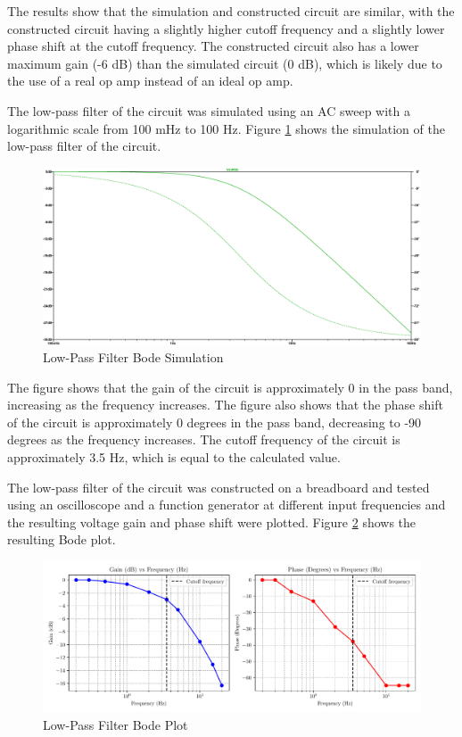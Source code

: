 \documentclass[CMPE]{KGCOEReport}
\begin{document}
The results show that the simulation and constructed circuit are similar, with the constructed circuit having a slightly higher cutoff frequency and a slightly lower phase shift at the cutoff frequency. The constructed circuit also has a lower maximum gain (-6 dB) than the simulated circuit (0 dB), which is likely due to the use of a real op amp instead of an ideal op amp.

\bigskip

The low-pass filter of the circuit was simulated using an AC sweep with a logarithmic scale from 100 mHz to 100 Hz. Figure \ref{fig:lowPassSim} shows the simulation of the low-pass filter of the circuit.

\begin{figure}[H]
    \centering
    \includegraphics[width=1\textwidth]{SimFreqLowPass.png}
    \caption{Low-Pass Filter Bode Simulation}
    \label{fig:lowPassSim}
\end{figure}

The figure shows that the gain of the circuit is approximately 0 in the pass band, increasing as the frequency increases. The figure also shows that the phase shift of the circuit is approximately 0 degrees in the pass band, decreasing to -90 degrees as the frequency increases. The cutoff frequency of the circuit is approximately 3.5 Hz, which is equal to the calculated value.

The low-pass filter of the circuit was constructed on a breadboard and tested using an oscilloscope and a function generator at different input frequencies and the resulting voltage gain and phase shift were plotted. Figure \ref{fig:lowPassBode} shows the resulting Bode plot.

\begin{figure}[H]
    \centering
    \includegraphics[width=1\textwidth]{low_pass_plot.pdf}
    \caption{Low-Pass Filter Bode Plot}
    \label{fig:lowPassBode}
\end{figure}
\end{document}
